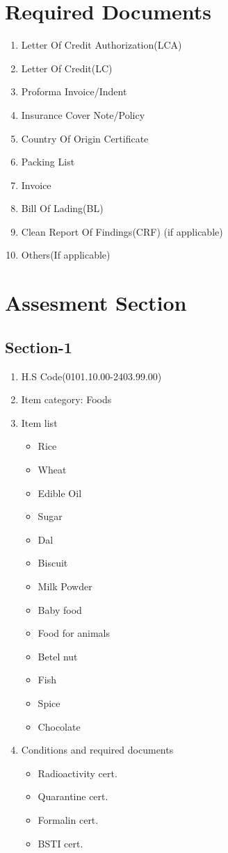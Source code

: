 \documentclass[10pt]{article}
\begin{document}
\section{Required Documents\label{Docs}}
\begin{enumerate}
        \item Letter Of Credit Authorization(LCA)
        \item Letter Of Credit(LC)
        \item Proforma Invoice/Indent
        \item Insurance Cover Note/Policy 
        \item Country Of Origin Certificate
        \item Packing List
        \item Invoice
        \item Bill Of Lading(BL)
        \item Clean Report Of Findings(CRF) (if applicable)
        \item Others(If applicable)

\end{enumerate}

\section{Assesment Section\label{Assesment Section}}
\subsection{Section-1}\label{sec-1}
\begin{enumerate}
    \item H.S Code(0101.10.00-2403.99.00)
    \item Item category: Foods
    \item Item list
\begin{itemize}
    \item Rice
    \item Wheat
    \item Edible Oil
    \item Sugar
    \item Dal
    \item Biscuit
    \item Milk Powder
    \item Baby food
    \item Food for animals
    \item Betel nut
    \item Fish
    \item Spice
    \item Chocolate
\end{itemize}
    \item Conditions and required documents
\begin{itemize}
    \item Radioactivity cert.
    \item Quarantine cert.
    \item Formalin cert.
    \item BSTI cert.
\end{itemize}
\end{enumerate}
    
\end{document}

